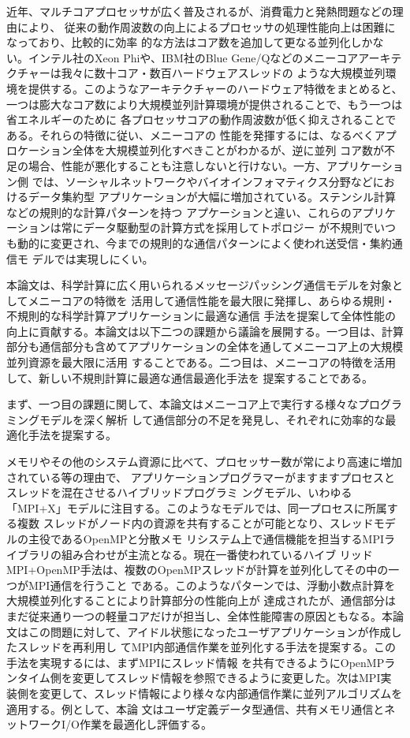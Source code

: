 近年、マルチコアプロセッサが広く普及されるが、消費電力と発熱問題などの理由により、
従来の動作周波数の向上によるプロセッサの処理性能向上は困難になっており、比較的に効率
的な方法はコア数を追加して更なる並列化しかない。インテル社のXeon Phiや、IBM社のBlue 
Gene/Qなどのメニーコアアーキテクチャーは我々に数十コア・数百ハードウェアスレッドの
ような大規模並列環境を提供する。このようなアーキテクチャーのハードウェア特徴をまとめると、
一つは膨大なコア数により大規模並列計算環境が提供されることで、もう一つは省エネルギーのために
各プロセッサコアの動作周波数が低く抑えされることである。それらの特徴に従い、メニーコアの
性能を発揮するには、なるべくアプロケーション全体を大規模並列化すべきことがわかるが、逆に並列
コア数が不足の場合、性能が悪化することも注意しないと行けない。一方、アプリケーション側
では、ソーシャルネットワークやバイオインフォマティクス分野などにおけるデータ集約型
アプリケーションが大幅に増加されている。ステンシル計算などの規則的な計算パターンを持つ
アプケーションと違い、これらのアプリケーションは常にデータ駆動型の計算方式を採用してトポロジー
が不規則でいつも動的に変更され、今までの規則的な通信パターンによく使われ送受信・集約通信モ
デルでは実現しにくい。


本論文は、科学計算に広く用いられるメッセージパッシング通信モデルを対象としてメニーコアの特徴を
活用して通信性能を最大限に発揮し、あらゆる規則・不規則的な科学計算アプリケーションに最適な通信
手法を提案して全体性能の向上に貢献する。本論文は以下二つの課題から議論を展開する。一つ目は、計算
部分も通信部分も含めてアプリケーションの全体を通してメニーコア上の大規模並列資源を最大限に活用
することである。二つ目は、メニーコアの特徴を活用して、新しい不規則計算に最適な通信最適化手法を
提案することである。

まず、一つ目の課題に関して、本論文はメニーコア上で実行する様々なプログラミングモデルを深く解析
して通信部分の不足を発見し、それぞれに効率的な最適化手法を提案する。

メモリやその他のシステム資源に比べて、プロセッサー数が常により高速に増加されている等の理由で、
アプリケーションプログラマーがますますプロセスとスレッドを混在させるハイブリッドプログラミ
ングモデル、いわゆる「MPI+X」モデルに注目する。このようなモデルでは、同一プロセスに所属する複数
スレッドがノード内の資源を共有することが可能となり、スレッドモデルの主役であるOpenMPと分散メモ
リシステム上で通信機能を担当するMPIライブラリの組み合わせが主流となる。現在一番使われているハイブ
リッドMPI+OpenMP手法は、複数のOpenMPスレッドが計算を並列化してその中の一つがMPI通信を行うこと
である。このようなパターンでは、浮動小数点計算を大規模並列化することにより計算部分の性能向上が
達成されたが、通信部分はまだ従来通り一つの軽量コアだけが担当し、全体性能障害の原因ともなる。本論
文はこの問題に対して、アイドル状態になったユーザアプリケーションが作成したスレッドを再利用し
てMPI内部通信作業を並列化する手法を提案する。この手法を実現するには、まずMPIにスレッド情報
を共有できるようにOpenMPランタイム側を変更してスレッド情報を参照できるように変更した。次はMPI実
装側を変更して、スレッド情報により様々な内部通信作業に並列アルゴリズムを適用する。例として、本論
文はユーザ定義データ型通信、共有メモリ通信とネットワークI/O作業を最適化し評価する。

